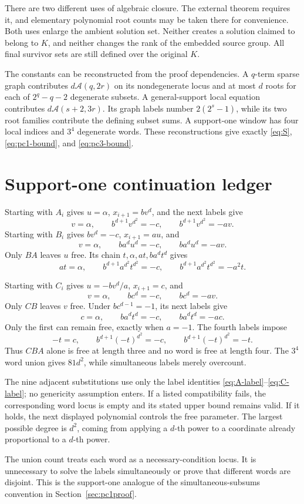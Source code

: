 \documentclass[11pt]{article}
\theoremstyle{definition}
\newcommand{\Acal}{\mathcal A}
\begin{document}
There are two different uses of algebraic closure. The external theorem requires it, and elementary polynomial root counts may be taken there for convenience. Both uses enlarge the ambient solution set. Neither creates a solution claimed to belong to \(K\), and neither changes the rank of the embedded source group. All final survivor sets are still defined over the original \(K\).

The constants can be reconstructed from the proof dependencies. A \(q\)-term sparse graph contributes \(d\Acal(q,2r)\) on its nondegenerate locus and at most \(d\) roots for each of \(2^q-q-2\) degenerate subsets. A general-support local equation contributes \(d\Acal(s+2,3r)\). Its graph labels number \(2(2^s-1)\), while its two root families contribute the defining subset sums. A support-one window has four local indices and \(3^4\) degenerate words. These reconstructions give exactly \eqref{eq:S}, \eqref{eq:pc1-bound}, and \eqref{eq:pc3-bound}.

\section{Support-one continuation ledger}
\label{app:support-one-ledger}

Starting with \(A_i\) gives \(u=\alpha\), \(x_{i+1}=bv^d\), and the next labels give
\[
 v=\alpha,\qquad b^{d+1}v^{d^2}=-c,\qquad
 b^{d+1}v^{d^2}=-av.
\]
Starting with \(B_i\) gives \(bv^d=-c\), \(x_{i+1}=au\), and
\[
 v=\alpha,\qquad ba^du^d=-c,\qquad ba^du^d=-av.
\]
Only \(BA\) leaves \(u\) free. Its chain \(t,\alpha,at,ba^dt^d\) gives
\[
 at=\alpha,\qquad b^{d+1}a^{d^2}t^{d^2}=-c,\qquad
 b^{d+1}a^{d^2}t^{d^2}=-a^2t.
\]

Starting with \(C_i\) gives \(u=-bv^d/a\), \(x_{i+1}=c\), and
\[
 v=\alpha,\qquad bc^d=-c,\qquad bc^d=-av.
\]
Only \(CB\) leaves \(v\) free. Under \(bc^{d-1}=-1\), its next labels give
\[
 c=\alpha,\qquad ba^dt^d=-c,\qquad ba^dt^d=-ac.
\]
Only the first can remain free, exactly when \(a=-1\). The fourth labels impose
\[
 -t=c,\qquad b^{d+1}(-t)^{d^2}=-c,\qquad
 b^{d+1}(-t)^{d^2}=-t.
\]
Thus \(CBA\) alone is free at length three and no word is free at length four. The \(3^4\) word union gives \(81d^2\), while simultaneous labels merely overcount.


The nine adjacent substitutions use only the label identities \eqref{eq:A-label}--\eqref{eq:C-label}; no genericity assumption enters. If a listed compatibility fails, the corresponding word locus is empty and its stated upper bound remains valid. If it holds, the next displayed polynomial controls the free parameter. The largest possible degree is \(d^2\), coming from applying a \(d\)-th power to a coordinate already proportional to a \(d\)-th power.

The union count treats each word as a necessary-condition locus. It is unnecessary to solve the labels simultaneously or prove that different words are disjoint. This is the support-one analogue of the simultaneous-subsums convention in Section~\ref{sec:pc1proof}.

\clearpage


\end{document}
